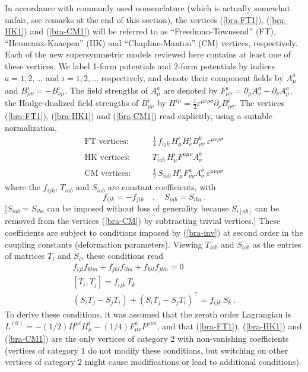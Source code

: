 \documentclass[a4paper,12pt]{article}
\begin{document}
In accordance with commonly used nomenclature (which is actually
somewhat unfair, see remarks at the end of this section),
the vertices (\ref{bra-FT1}), (\ref{bra-HK1}) and (\ref{bra-CM1})
will be referred to as
``Freedman-Townsend'' (FT), ``Henneaux-Knaepen'' (HK)
and ``Chapline-Manton'' (CM) vertices, respectively.
Each of the new supersymmetric models reviewed here contains
at least one of these vertices. We label 
1-form potentials and 2-form potentials by indices
$a=1,2,\dots$ and $i=1,2,\dots$ respectively,
and denote their component fields by 
$A_\mu^a$ and $B_{\mu\nu}^i=-B_{\nu\mu}^i$.
The field strengths of $A_\mu^a$
are denoted by $F_{\mu\nu}^a=\partial _\mu A_\nu^a-\partial _\nu A_\mu^a$,
the Hodge-dualized field strengths of $B_{\mu\nu}^i$
by $H^{i\mu}=\frac 12 \varepsilon^{\mu\nu\rho\sigma}
\partial _\nu B^i_{\rho\sigma}$. The vertices
(\ref{bra-FT1}), (\ref{bra-HK1}) and (\ref{bra-CM1}) read
explicitly, using a suitable normalization,
\begin{eqnarray}
\mbox{FT vertices:}&&\quad
\frac 14\,f_{ijk}\, H_\mu^i H_\nu^j 
B_{\rho\sigma}^k\,\varepsilon^{\mu\nu\rho\sigma}
\label{bra-FT}\\
\mbox{HK vertices:}&&\quad
T_{iab}\, H^i_\mu F^{a\mu\nu}A^b_\nu
\label{bra-HK}\\
\mbox{CM vertices:}&&\quad
\frac 12\,S_{iab}\, H^i_\mu F^a_{\nu\rho}A^b_\sigma\,
\varepsilon^{\mu\nu\rho\sigma}
\label{bra-CM}
\end{eqnarray}
where the $f_{ijk}$, $T_{iab}$ and $S_{iab}$ are
constant coefficients, with
\[
f_{ijk}=-f_{jik}\quad ,\quad S_{iab}=S_{iba}\ .
\]
[$S_{iab}=S_{iba}$ can be imposed without loss of generality because
$S_{i[ab]}$ can be removed from the vertices (\ref{bra-CM}) 
by subtracting trivial vertices.] 
These coefficients are subject to conditions
imposed by (\ref{bra-inv}) at second order in the coupling
constants (deformation parameters). 
Viewing $T_{iab}$ and $S_{iab}$ as the entries
of matrices $T_i$ and $S_i$, these conditions read
\begin{eqnarray}
& f_{ijl}f_{klm}+f_{jkl}f_{ilm}+f_{kil}f_{jlm}=0 &
\label{bra-jac}\\[4pt]
& [T_i,T_j]=f_{ijk}\,T_k &
\label{bra-rep}\\[4pt]
& (S_i T_j-S_j T_i)+(S_i T_j-S_j T_i)^\top=f_{ijk}\,S_k\ . &
\label{bra-new}
\end{eqnarray} 
To derive these conditions, it was assumed 
that the zeroth order Lagrangian is $L^{(0)}=-(1/2) H^{\mu i}H_\mu^i
-(1/4)F_{\mu\nu}^a F^{\mu\nu a}$, and that 
(\ref{bra-FT1}), (\ref{bra-HK1}) and (\ref{bra-CM1})
are the only vertices of category 2 with non-vanishing
coefficients (vertices of category 1
do not modify these conditions, but switching
on other vertices of category 2 might cause modifications
or lead to additional conditions).
\end{document}
